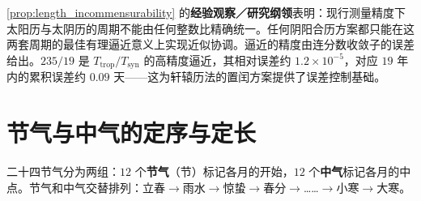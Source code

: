 \begin{remark}[不可通约性的数学意义]\label{rem:incommensurability_meaning}
\cref{prop:length_incommensurability} 的\textbf{经验观察／研究纲领}表明：现行测量精度下太阳历与太阴历的周期不能由任何整数比精确统一。任何阴阳合历方案都只能在这两套周期的最佳有理逼近意义上实现近似协调。逼近的精度由连分数收敛子的误差给出。\(235/19\) 是 \(T_{\text{trop}}/T_{\text{syn}}\) 的高精度逼近，其相对误差约 \(1.2\times 10^{-5}\)，对应 \(19\) 年内的累积误差约 \(0.09\) 天——这为轩辕历法的置闰方案提供了误差控制基础。
\end{remark}

\section{节气与中气的定序与定长}
\label{sec:jieqi_zhongqi}

\begin{definition}[节气与中气的区分]\label{def:jieqi_zhongqi}
二十四节气分为两组：\(12\) 个\textbf{节气}（节）标记各月的开始，\(12\) 个\textbf{中气}标记各月的中点。节气和中气交替排列：立春$\to$雨水$\to$惊蛰$\to$春分$\to$……$\to$小寒$\to$大寒。
\end{definition}

